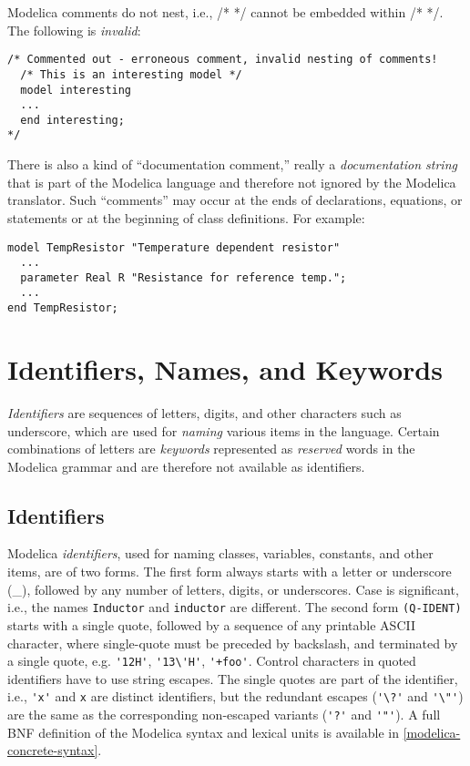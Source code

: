 Modelica comments do not nest, i.e., /* */ cannot be embedded within /*
*/. The following is \emph{invalid}:
\begin{lstlisting}[language=modelica]
/* Commented out - erroneous comment, invalid nesting of comments!
  /* This is an interesting model */
  model interesting
  ...
  end interesting;
*/
\end{lstlisting}

There is also a kind of ``documentation comment,'' really a
\emph{documentation string} that is part of the Modelica language and
therefore not ignored by the Modelica translator. Such ``comments'' may
occur at the ends of declarations, equations, or statements or at the
beginning of class definitions. For example:

\begin{lstlisting}[language=modelica]
model TempResistor "Temperature dependent resistor"
  ...
  parameter Real R "Resistance for reference temp.";
  ...
end TempResistor;
\end{lstlisting}

\section{Identifiers, Names, and Keywords}

\emph{Identifiers} are sequences of letters, digits, and other
characters such as underscore, which are used for \emph{naming} various
items in the language. Certain combinations of letters are
\emph{keywords} represented as \emph{reserved} words in the Modelica
grammar and are therefore not available as identifiers.

\subsection{Identifiers}

Modelica \emph{identifiers}, used for naming classes, variables,
constants, and other items, are of two forms. The first form always
starts with a letter or underscore (\_), followed by any number of
letters, digits, or underscores. Case is significant, i.e., the names
\lstinline!Inductor! and \lstinline!inductor! are different. The second form \lstinline!(Q-IDENT)! starts
with a single quote, followed by a sequence of any printable ASCII
character, where single-quote must be preceded by backslash, and
terminated by a single quote, e.g. \lstinline!'12H'!, \lstinline!'13\'H'!,
\lstinline!'+foo'!. Control characters in quoted identifiers have to use string
escapes.
The single quotes are part of the identifier, i.e., \lstinline!'x'! and \lstinline!x!
are distinct identifiers, but the redundant escapes (\lstinline!'\?'! and \lstinline!'\"'!) are the same as the corresponding non-escaped
variants (\lstinline!'?'! and \lstinline!'"'!). A full BNF definition of the Modelica syntax and
lexical units is available in \autoref{modelica-concrete-syntax}.

